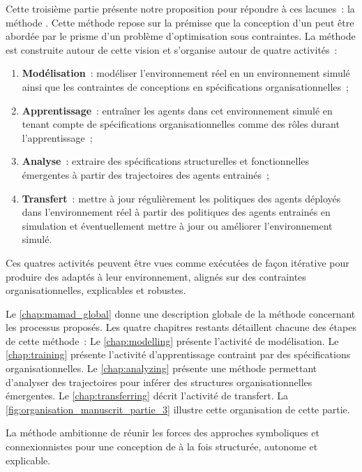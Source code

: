 \noindent
Cette troisième partie présente notre proposition pour répondre à ces lacunes~: la méthode . Cette méthode repose sur la prémisse que la conception d'un  peut être abordée par le prisme d'un problème d'optimisation sous contraintes. La méthode est construite autour de cette vision et s'organise autour de quatre activités~:

\begin{enumerate}
  \item \textbf{Modélisation}~: modéliser l'environnement réel en un environnement simulé ainsi que les contraintes de conceptions en spécifications organisationnelles~;
  \item \textbf{Apprentissage}~: entraîner les agents dans cet environnement simulé en tenant compte de spécifications organisationnelles comme des rôles durant l'apprentissage~;
  \item \textbf{Analyse}~: extraire des spécifications structurelles et fonctionnelles émergentes à partir des trajectoires des agents entrainés~;
  \item \textbf{Transfert}~: mettre à jour régulièrement les politiques des agents déployés dans l'environnement réel à partir des politiques des agents entrainés en simulation et éventuellement mettre à jour ou améliorer l'environnement simulé.
\end{enumerate}

\noindent
Ces quatres activités peuvent être vues comme exécutées de façon itérative pour produire des  adaptés à leur environnement, alignés sur des contraintes organisationnelles, explicables et robustes.

\medskip

\noindent
Le \autoref{chap:mamad_global} donne une description globale de la méthode concernant les processus proposés. Les quatre chapitres restants détaillent chacune des étapes de cette méthode~:
Le \autoref{chap:modelling} présente l'activité de modélisation.
Le \autoref{chap:training} présente l'activité d'apprentissage contraint par des spécifications organisationnelles.
Le \autoref{chap:analyzing} présente une méthode permettant d'analyser des trajectoires pour inférer des structures organisationnelles émergentes.
Le \autoref{chap:transferring} décrit l'activité de transfert.
La \autoref{fig:organisation_manuscrit_partie_3} illustre cette organisation de cette partie.

La méthode  ambitionne de réunir les forces des approches symboliques et connexionnistes pour une conception de  à la fois structurée, autonome et explicable.

